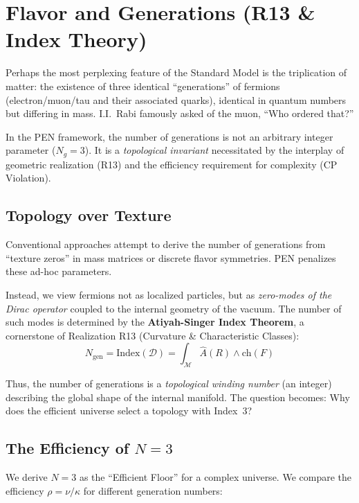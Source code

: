 \documentclass[12pt,a4paper]{article}
\theoremstyle{definition}
\newcommand{\kap}{\kappa}
\begin{document}
\section{Flavor and Generations (R13 \& Index Theory)}

Perhaps the most perplexing feature of the Standard Model is the triplication of matter: the existence of three identical ``generations'' of fermions (electron/muon/tau and their associated quarks), identical in quantum numbers but differing in mass. I.I.~Rabi famously asked of the muon, ``Who ordered that?''

In the PEN framework, the number of generations is not an arbitrary integer parameter ($N_g=3$). It is a \emph{topological invariant} necessitated by the interplay of geometric realization (R13) and the efficiency requirement for complexity (CP Violation).

\subsection{Topology over Texture}

Conventional approaches attempt to derive the number of generations from ``texture zeros'' in mass matrices or discrete flavor symmetries. PEN penalizes these ad-hoc parameters.

Instead, we view fermions not as localized particles, but as \emph{zero-modes of the Dirac operator} coupled to the internal geometry of the vacuum. The number of such modes is determined by the \textbf{Atiyah-Singer Index Theorem}, a cornerstone of Realization R13 (Curvature \& Characteristic Classes):
\begin{equation}
    N_{\text{gen}} = \text{Index}(\mathcal{D}) = \int_{\mathcal{M}} \hat{A}(R) \wedge \text{ch}(F)
\end{equation}

Thus, the number of generations is a \emph{topological winding number} (an integer) describing the global shape of the internal manifold. The question becomes: Why does the efficient universe select a topology with Index~3?

\subsection{The Efficiency of $N=3$}

We derive $N=3$ as the ``Efficient Floor'' for a complex universe. We compare the efficiency $\rho = \nu/\kap$ for different generation numbers:
\end{document}
